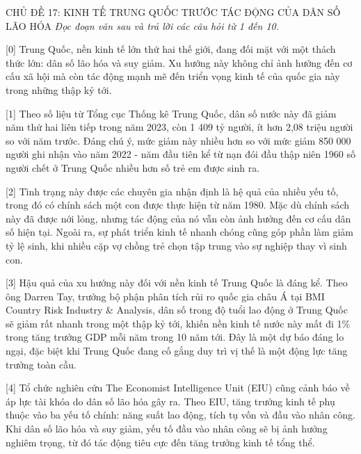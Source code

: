 \documentclass[12pt,a4paper,twoside]{article}
\newenvironment{readingpassage}[1][]{%
    \begin{tcolorbox}[enhanced, colback=grayLight, colframe=secondaryBlue,
        coltitle=textDark, fonttitle=\bfseries, title={#1},
        rounded corners, arc=3mm, boxrule=1pt,
        left=15pt, right=15pt, top=10pt, bottom=10pt,
        breakable, before skip=10pt, after skip=10pt, drop fuzzy shadow]
    \setstretch{1.3}
}{\end{tcolorbox}}
\begin{document}
\newpage
\label{a_cd17}
\begin{topicbox}{\large CHỦ ĐỀ 17: KINH TẾ TRUNG QUỐC TRƯỚC TÁC ĐỘNG CỦA DÂN SỐ LÃO HÓA}
\vspace{8pt}
\textit{Đọc đoạn văn sau và trả lời các câu hỏi từ 1 đến 10.}
\vspace{6pt}
\end{topicbox}
\vspace{5pt}
\begin{readingpassage}[]
[0] Trung Quốc, nền kinh tế lớn thứ hai thế giới, đang đối mặt với một thách thức lớn: dân số lão hóa và suy giảm. Xu hướng này không chỉ ảnh hưởng đến cơ cấu xã hội mà còn tác động mạnh mẽ đến triển vọng kinh tế của quốc gia này trong những thập kỷ tới.

[1] Theo số liệu từ Tổng cục Thống kê Trung Quốc, dân số nước này đã giảm năm thứ hai liên tiếp trong năm 2023, còn 1 409 tỷ người, ít hơn 2,08 triệu người so với năm trước. Đáng chú ý, mức giảm này nhiều hơn so với mức giảm 850 000 người ghi nhận vào năm 2022 - năm đầu tiên kể từ nạn đói đầu thập niên 1960 số người chết ở Trung Quốc nhiều hơn số trẻ em được sinh ra.

[2] Tình trạng này được các chuyên gia nhận định là hệ quả của nhiều yếu tố, trong đó có chính sách một con được thực hiện từ năm 1980. Mặc dù chính sách này đã được nới lỏng, nhưng tác động của nó vẫn còn ảnh hưởng đến cơ cấu dân số hiện tại. Ngoài ra, sự phát triển kinh tế nhanh chóng cũng góp phần làm giảm tỷ lệ sinh, khi nhiều cặp vợ chồng trẻ chọn tập trung vào sự nghiệp thay vì sinh con.

[3] Hậu quả của xu hướng này đối với nền kinh tế Trung Quốc là đáng kể. Theo ông Darren Tay, trưởng bộ phận phân tích rủi ro quốc gia châu Á tại BMI Country Risk Industry \& Analysis, dân số trong độ tuổi lao động ở Trung Quốc sẽ giảm rất nhanh trong một thập kỷ tới, khiến nền kinh tế nước này mất đi 1\% trong tăng trưởng GDP mỗi năm trong 10 năm tới. Đây là một dự báo đáng lo ngại, đặc biệt khi Trung Quốc đang cố gắng duy trì vị thế là một động lực tăng trưởng toàn cầu.

[4] Tổ chức nghiên cứu The Economist Intelligence Unit (EIU) cũng cảnh báo về áp lực tài khóa do dân số lão hóa gây ra. Theo EIU, tăng trưởng kinh tế phụ thuộc vào ba yếu tố chính: năng suất lao động, tích tụ vốn và đầu vào nhân công. Khi dân số lão hóa và suy giảm, yếu tố đầu vào nhân công sẽ bị ảnh hưởng nghiêm trọng, từ đó tác động tiêu cực đến tăng trưởng kinh tế tổng thể.


\end{readingpassage}
\end{document}
